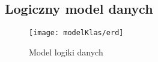 \subsection{Logiczny model danych}
\begin{adjustwidth}{2em}{0pt}
\begin{figure}[H]
    \centering
	\texttt{[image: modelKlas/erd]}
    \caption{Model logiki danych}
    \label{fig:Deploymentdiagram1}
\end{figure}
\end{adjustwidth}